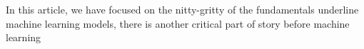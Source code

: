 In this article, we have focused on the nitty-gritty of the fundamentals underline machine learning models, there is another critical part of story before machine learning  